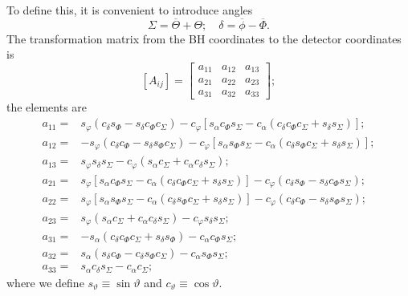 \documentclass[a4paper, 11pt, titlepage, twoside]{report}
\begin{document}
To define this, it is convenient to introduce angles
\begin{equation}
\Sigma = \overline{\Theta} + \Theta; \quad \delta = \overline{\phi} - \overline{\Phi}.
\end{equation}
The transformation matrix from the BH coordinates to the detector coordinates is
\begin{equation}
\left[A_{ij}\right] = \begin{bmatrix}
a_{11} & a_{12} & a_{13} \\
a_{21} & a_{22} & a_{23} \\
a_{31} & a_{32} & a_{33}
\end{bmatrix};
\end{equation}
the elements are
\begin{align}
a_{11} = {} & s_\varphi\left(c_\delta s_\Phi - s_\delta c_\Phi c_\Sigma\right) - c_\varphi \left[s_\alpha c_\Phi s_\Sigma - c_\alpha \left(c_\delta c_\Phi c_\Sigma + s_\delta s_\Sigma\right)\right]; \\
a_{12} = {} & -s_\varphi\left(c_\delta c_\Phi - s_\delta s_\Phi c_\Sigma\right) - c_\varphi \left[s_\alpha s_\Phi s_\Sigma - c_\alpha \left(c_\delta s_\Phi c_\Sigma + s_\delta s_\Sigma\right)\right]; \\
a_{13} = {} & s_\varphi s_\delta s_\Sigma - c_\varphi\left(s_\alpha c_\Sigma + c_\alpha c_\delta s_\Sigma\right); \\
a_{21} = {} & s_\varphi\left[s_\alpha c_\Phi s_\Sigma - c_\alpha \left(c_\delta c_\Phi c_\Sigma + s_\delta s_\Sigma\right)\right] - c_\varphi \left(c_\delta s_\Phi - s_\delta c_\Phi s_\Sigma\right); \\
a_{22} = {} & s_\varphi\left[s_\alpha s_\Phi s_\Sigma - c_\alpha \left(c_\delta s_\Phi c_\Sigma + s_\delta s_\Sigma\right)\right] - c_\varphi \left(c_\delta c_\Phi - s_\delta s_\Phi s_\Sigma\right); \\
a_{23} = {} & s_\varphi\left(s_\alpha c_\Sigma + c_\alpha c_\delta s_\Sigma\right) - c_\varphi s_\delta s_\Sigma; \\
a_{31} = {} & -s_\alpha\left(c_\delta c_\Phi c_\Sigma + s_\delta s_\Phi\right) - c_\alpha c_\Phi s_\Sigma; \\
a_{32} = {} & s_\alpha\left(s_\delta c_\Phi - c_\delta s_\Phi c_\Sigma\right) - c_\alpha s_\Phi s_\Sigma; \\
a_{33} = {} & s_\alpha c_\delta s_\Sigma - c_\alpha c_\Sigma;
\end{align}
where we define $s_\vartheta \equiv \sin \vartheta$ and $c_\vartheta \equiv \cos \vartheta$.
\end{document}
